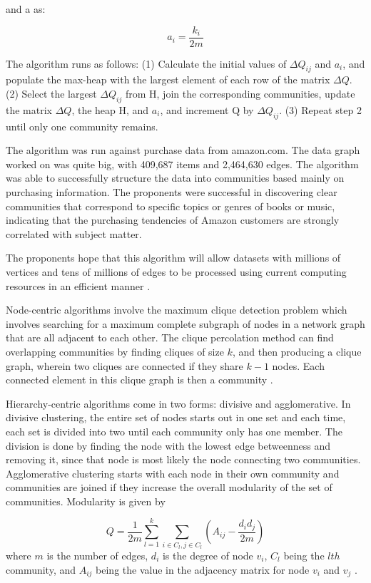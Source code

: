 and a as:

\begin{equation}
a_i = \frac{k_i}{2m}
\end{equation}

The algorithm runs as follows:
(1) Calculate the initial values of $\Delta Q_{ij}$ and $a_{i}$, and populate the max-heap with the largest element of each row of the matrix $\Delta Q$.
(2) Select the largest $\Delta Q_{ij}$ from H, join the corresponding
communities, update the matrix $\Delta Q$, the heap H, and $a_{i}$, and increment Q by $\Delta Q_{ij}$.
(3) Repeat step 2 until only one community remains.

The algorithm was run against purchase data from amazon.com. The data graph worked on was quite big, with 409,687 items and 2,464,630 edges. The algorithm was able to successfully structure the data into communities based mainly on purchasing information. The proponents were successful in discovering clear communities that correspond to specific topics or genres of books or music, indicating that the purchasing tendencies of Amazon customers are strongly correlated with subject matter.

The proponents hope that this algorithm will allow datasets with millions of vertices and tens of millions of edges to be processed using current computing resources in an efficient manner \cite{Clauset:2004}.

Node-centric algorithms involve the maximum clique detection problem which involves searching for a maximum complete subgraph of nodes in a network graph that are all adjacent to each other. The clique percolation method can find overlapping communities by finding cliques of size $k$, and then producing a clique graph, wherein two cliques are connected if they share $k-1$ nodes. Each connected element in this clique graph is then a community \cite{Tang:2010}.

Hierarchy-centric algorithms come in two forms: divisive and agglomerative. In divisive clustering, the entire set of nodes starts out in one set and each time, each set is divided into two until each community only has one member. The division is done by finding the node with the lowest edge betweenness and removing it, since that node is most likely the node connecting two communities. Agglomerative clustering starts with each node in their own community and communities are joined if they increase the overall modularity of the set of communities. Modularity is given by

\begin{equation}
Q = \frac{1}{2m} \sum_{l = 1}^{k} \sum_{i \in C_l, j \in C_l} (A_{ij} - \frac{d_i d_j}{2m})
\end{equation}where $m$ is the number of edges, $d_i$ is the degree of node $v_i$, $C_l$ being the $lth$ community, and $A_{ij}$ being the value in the adjacency matrix for node $v_i$ and $v_j$ \cite{Tang:2010} .

